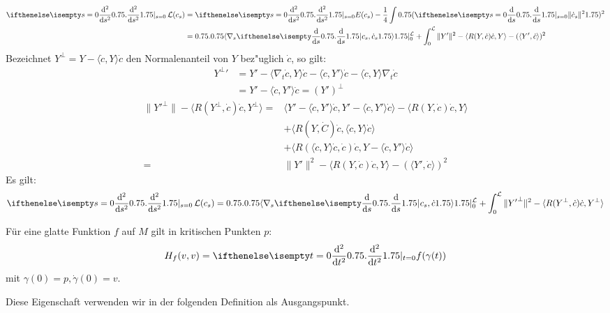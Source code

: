 \begin{align*}
  \difffrac[s=0]{^2}{s^2} \calL(c_s) &= \difffrac[s=0]{^2}{s^2} E(c_s) - \frac{1}{4} \int \left( \difffrac[s=0]{}{s} \| \dot c_s \|^2 \right)^2 \\
  &= \left.\left\langle \nabla_s \difffrac{}{s} c_s, \dot c_s
    \right\rangle\right|_{0}^{\calL} + \int_0^{\calL} \| Y' \|^2 -
  \langle R(Y, \dot c) \dot c, Y \rangle - ( \langle Y', \dot c
  \rangle )^2
\end{align*}
Bezeichnet $Y^\perp = Y - \langle \dot c, Y \rangle \dot c$ den
Normalenanteil von $Y$ bez"uglich $\dot c$, so gilt:
\begin{align*}
  {Y^\perp}' &= Y' - \langle \nabla_t \dot c, Y \rangle \dot c - \langle \dot c, Y' \rangle \dot c - \langle \dot c, Y \rangle \nabla_t \dot c \\
  &= Y' - \langle \dot c, Y' \rangle \dot c = (Y')^\perp
\end{align*}
\begin{align*}
  \| {Y'}^\perp \| - \langle R(Y^\perp, \dot c) \dot c, Y^\perp \rangle ={}& \langle Y' - \langle \dot c, Y' \rangle \dot c, Y' - \langle \dot c, Y' \rangle \dot c \rangle - \langle R(Y, \dot c) \dot c, Y \rangle \\
  & + \langle R(Y, \dot C) \dot c, \langle \dot c, Y \rangle \dot c \rangle \\
  & + \langle R ( \langle \dot c, Y \rangle \dot c, \dot c) \dot c, Y - \langle \dot c, Y' \rangle \dot c \rangle \\
  ={}& \| Y' \|^2 - \langle R(Y, \dot c) \dot c, Y \rangle - ( \langle
  Y', \dot c \rangle )^2
\end{align*}
Es gilt:
\begin{align*}
  \difffrac[s=0]{^2}{s^2} \calL(c_s) = \left.\left\langle \nabla_s
      \difffrac{}{s} c_s, \dot c \right\rangle\right|_{0}^{\calL} +
  \int_0^{\calL} \| {Y'}^\perp \|^2 - \langle R(Y^\perp, \dot c) \dot
  c, Y^\perp \rangle
\end{align*}


\begin{emptythm}[Erinnerung]
  Für eine glatte Funktion $f$ auf $M$ gilt in kritischen Punkten $p$:
  \begin{align*}
    H_f(v,v) = \difffrac[t=0]{^2}{t^2}f(\gamma(t))
  \end{align*}
  mit $\gamma(0) = p, \dot\gamma(0) = v$.

  Diese Eigenschaft verwenden wir in der folgenden Definition als
  Ausgangspunkt.
\end{emptythm}

